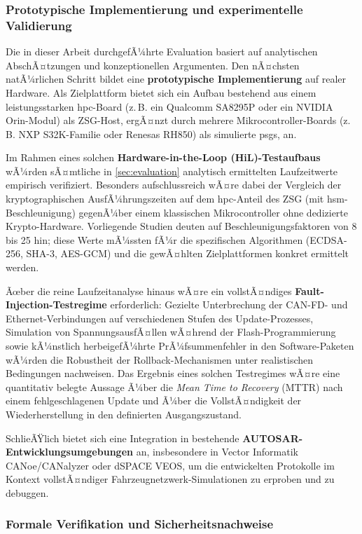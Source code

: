 ﻿\documentclass[12pt,a4paper,twoside]{article}
\begin{document}
\subsubsection{Prototypische Implementierung und experimentelle Validierung}

Die in dieser Arbeit durchgefÃ¼hrte Evaluation basiert auf analytischen
AbschÃ¤tzungen und konzeptionellen Argumenten. Den nÃ¤chsten natÃ¼rlichen
Schritt bildet eine \textbf{prototypische Implementierung} auf realer
Hardware. Als Zielplattform bietet sich ein Aufbau bestehend aus einem
leistungsstarken \gls{hpc}-Board (z.\,B. ein Qualcomm SA8295P oder ein
NVIDIA Orin-Modul) als ZSG-Host, ergÃ¤nzt durch mehrere
Mikrocontroller-Boards (z.\,B. NXP S32K-Familie oder Renesas RH850) als
simulierte \glspl{psg}, an.

Im Rahmen eines solchen \textbf{Hardware-in-the-Loop (HiL)-Testaufbaus}
wÃ¼rden sÃ¤mtliche in \cref{sec:evaluation} analytisch ermittelten
Laufzeitwerte empirisch verifiziert. Besonders aufschlussreich wÃ¤re
dabei der Vergleich der kryptographischen AusfÃ¼hrungszeiten auf
dem \gls{hpc}-Anteil des ZSG (mit \gls{hsm}-Beschleunigung) gegenÃ¼ber
einem klassischen Mikrocontroller ohne dedizierte Krypto-Hardware.
Vorliegende Studien deuten auf Beschleunigungsfaktoren von 8 bis 25 hin;
diese Werte mÃ¼ssten fÃ¼r die spezifischen Algorithmen (ECDSA-256,
SHA-3, AES-GCM) und die gewÃ¤hlten Zielplattformen konkret ermittelt werden.

Ãœber die reine Laufzeitanalyse hinaus wÃ¤re ein vollstÃ¤ndiges
\textbf{Fault-Injection-Test\-regime} erforderlich: Gezielte Unterbrechung
der CAN-FD- und Ethernet-Verbindungen auf verschiedenen Stufen des
Update-Prozesses, Simulation von SpannungsausfÃ¤llen wÃ¤hrend der
Flash-Programmierung sowie kÃ¼nstlich herbeigefÃ¼hrte PrÃ¼fsummenfehler
in den Software-Paketen wÃ¼rden die Robustheit der Rollback-Mechanismen
unter realistischen Bedingungen nachweisen. Das Ergebnis eines solchen
Testregimes wÃ¤re eine quantitativ belegte Aussage Ã¼ber die
\emph{Mean Time to Recovery} (MTTR) nach einem fehlgeschlagenen Update
und Ã¼ber die VollstÃ¤ndigkeit der Wiederherstellung in den definierten
Ausgangszustand.

SchlieÃŸlich bietet sich eine Integration in bestehende
\textbf{AUTOSAR-Entwicklungsumge\-bungen} an, insbesondere in
Vector Informatik CANoe/CANalyzer oder dSPACE VEOS, um
die entwickelten Protokolle im Kontext vollstÃ¤ndiger
Fahrzeugnetzwerk-Simulationen zu erproben und zu debuggen.

\subsubsection{Formale Verifikation und Sicherheitsnachweise}
\end{document}
